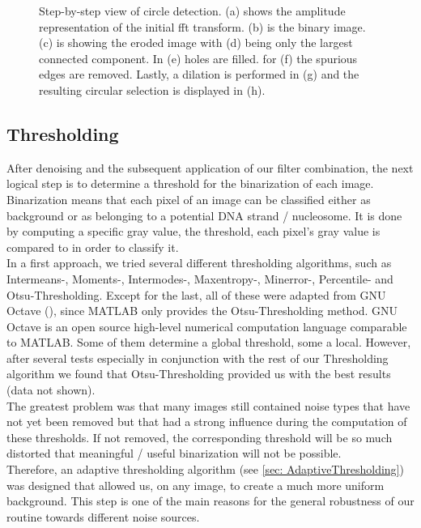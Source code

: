 \documentclass{article}
\begin{document}
\begin{figure}[!htb]
\begin{subfigure}[b]{0.24\textwidth}
                \caption{}
                \label{fig:mouse}
        \end{subfigure}
        \caption{Step-by-step view of circle detection. (a) shows the amplitude representation of the initial fft transform.
(b) is the binary image.
(c) is showing the eroded image with (d) being only the largest connected component.
In (e) holes are filled. for (f) the spurious edges are removed.
Lastly, a dilation is performed in (g) and the resulting circular selection is displayed in (h).}\label{fig:lowpass}
\end{figure}
\fi

\subsection{Thresholding}\label{sec:Thresholding}
After denoising and the subsequent application of our filter combination, the next logical step is to determine a threshold for the binarization of each image. Binarization means that each pixel of an image can be classified either as background or as belonging to a potential DNA strand / nucleosome. It is done by computing a specific gray value, the threshold, each pixel's gray value is compared to in order to classify it.\\
In a first approach, we tried several different thresholding algorithms, such as Intermeans-, Moments-, Intermodes-, Maxentropy-, Minerror-, Percentile- and Otsu-Thresholding. Except for the last, all of these were adapted from GNU Octave (\cite{GNUOctave}), since MATLAB only provides the Otsu-Thresholding method. GNU Octave is an open source high-level numerical computation language comparable to MATLAB. Some of them determine a global threshold, some a local. However, after several tests especially in conjunction with the rest of our Thresholding algorithm we found that Otsu-Thresholding provided us with the best results (data not shown).\\
The greatest problem was that many images still contained noise types that have not yet been removed but that had a strong influence during the computation of these thresholds. If not removed, the corresponding threshold will be so much distorted that meaningful / useful binarization will not be possible.\\
Therefore, an adaptive thresholding algorithm (see \ref{sec: AdaptiveThresholding}) was designed that allowed us, on any image, to create a much more uniform background. This step is one of the main reasons for the general robustness of our routine towards different noise sources.
\end{document}
